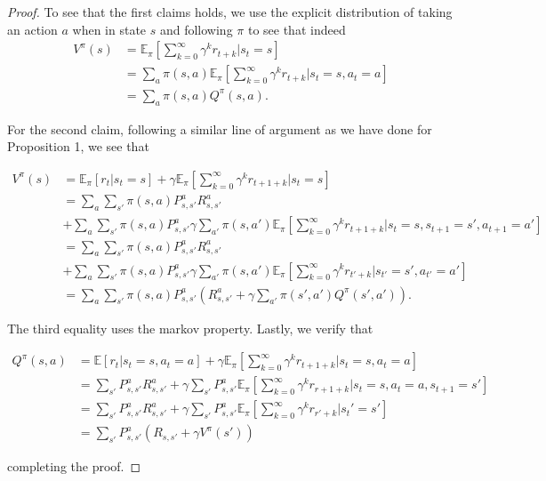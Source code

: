 \documentclass[11pt]{article} %
\begin{document}
\begin{proof}
	To see that the first claims holds, we use the explicit distribution of taking an action $a$ when in state $s$ and following $\pi$ to see that indeed
	\[
		\begin{array}{rl}
			V^{\pi}(s)		& =  \mathbb{E}_{\pi}[\sum_{k=0}^{\infty} \gamma^k r_{t+k} | s_t = s] \\
						& =  \sum_a \pi(s,a) \mathbb{E}_{\pi}[\sum_{k=0}^{\infty} \gamma^k r_{t+k} | s_t = s, a_t = a] \\
						& = \sum_a \pi(s,a) Q^{\pi}(s,a).
		\end{array}
	\]

	For the second claim, following a similar line of argument as we have done for Proposition 1, we see that

	\[
		\begin{array}{rl}
			V^{\pi}(s)		& = \mathbb{E}_{\pi}[r_t | s_t = s] + \gamma \mathbb{E}_{\pi}[\sum_{k=0}^{\infty} \gamma^k r_{t+1+k} | s_t = s] \\
						& = \sum_a \sum_{s'} \pi(s,a) P_{s,s'}^a R_{s,s'}^a \\
						& + \sum_a \sum_{s'} \pi(s,a) P_{s,s'}^a \gamma  \sum_{a'} \pi(s,a') \mathbb{E}_{\pi}[\sum_{k=0}^{\infty} \gamma^k r_{t+1+k} | s_t = s, s_{t+1} = s', a_{t+1} = a'] \\
						& = \sum_a \sum_{s'} \pi(s,a) P_{s,s'}^a R_{s,s'}^a \\
						& + \sum_a \sum_{s'} \pi(s,a) P_{s,s'}^a \gamma  \sum_{a'} \pi(s,a') \mathbb{E}_{\pi}[\sum_{k=0}^{\infty} \gamma^k r_{t'+k} | s_{t'} = s', a_{t'} = a'] \\
						& =  \sum_a \sum_{s'} \pi(s,a) P_{s,s'}^a ( R_{s,s'}^a + \gamma \sum_{a'} \pi(s',a') Q^{\pi}(s',a') ).
		\end{array}
	\]

	The third equality uses the markov property. Lastly, we verify that

	\[
		\begin{array}{rl}
			Q^{\pi}(s,a)  	& = \mathbb{E}[r_t | s_t = s, a_t = a] + \gamma \mathbb{E}_{\pi}[\sum_{k=0}^{\infty} \gamma^k r_{t+1+k} | s_t = s, a_t = a] \\
						& = \sum_{s'} P_{s,s'}^a R_{s,s'}^a + \gamma \sum_{s'} P_{s,s'}^a \mathbb{E}_{\pi}[\sum_{k=0}^{\infty} \gamma^k r_{r+1+k} | s_t = s, a_t = a, s_{t+1} = s'] \\
						& = \sum_{s'} P_{s,s'}^a R_{s,s'}^a + \gamma \sum_{s'} P_{s,s'}^a \mathbb{E}_{\pi}[\sum_{k=0}^{\infty} \gamma^k r_{r'+k} | s_t' = s'] \\
						& = \sum_{s'} P_{s,s'}^a ( R_{s,s'} + \gamma V^{\pi}(s') )
		\end{array}
	\]

	completing the proof.

\end{proof}
\end{document}
